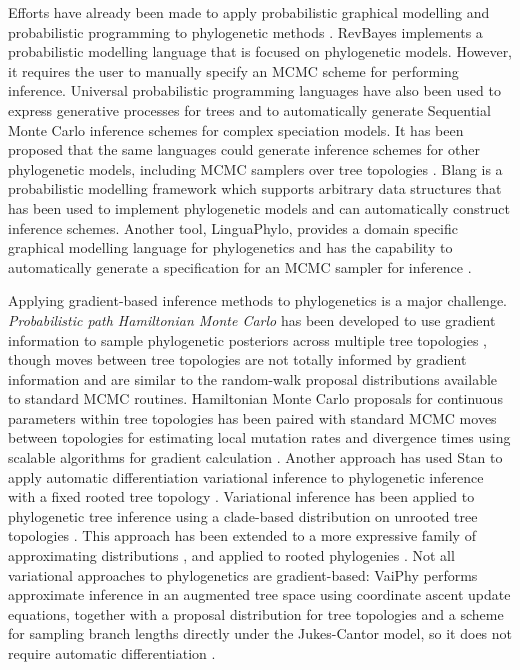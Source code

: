 Efforts have already been made to apply probabilistic graphical modelling and probabilistic programming to phylogenetic methods
\cite{hohna2014probabilistic, fourment2019evaluating, ronquist2021universal, drummond2023linguaphylo}. RevBayes \cite{hohna2016revbayes} implements a probabilistic modelling language that is focused on phylogenetic models. However, it requires the user to manually specify an MCMC scheme for performing inference. Universal probabilistic programming languages have also been used to express generative processes for trees and to automatically generate Sequential Monte Carlo inference schemes for complex speciation models. It has been proposed that the same languages could generate inference schemes for other phylogenetic models, including MCMC samplers over tree topologies \cite{ronquist2021universal, senderov2024treeppl}. Blang \cite{bouchard2022blang} is a probabilistic modelling framework which supports arbitrary data structures that has been used to implement phylogenetic models and can automatically construct inference schemes. Another tool, LinguaPhylo, provides a domain specific graphical modelling language for phylogenetics and has the capability to automatically generate a specification for an MCMC sampler for inference \cite{drummond2023linguaphylo}.

Applying gradient-based inference methods to phylogenetics is a major challenge. \textit{Probabilistic path Hamiltonian Monte Carlo} has been developed to use gradient information to sample phylogenetic posteriors across multiple tree topologies \cite{dinh2017probabilistic}, though moves between tree topologies are not totally informed by gradient information and are similar to the random-walk proposal distributions available to standard MCMC routines. Hamiltonian Monte Carlo proposals for continuous parameters within tree topologies has been paired with standard MCMC moves between topologies for estimating local mutation rates and divergence times using scalable algorithms for gradient calculation \cite{fisher2023shrinkage, ji2023scalable}. Another approach has used Stan to apply automatic differentiation variational inference to phylogenetic inference with a fixed rooted tree topology \cite{fourment2019evaluating}. Variational inference has been applied to phylogenetic tree inference using a clade-based distribution on unrooted tree topologies \cite{zhang2018variational}. This approach has been extended to a more expressive family of approximating distributions \cite{zhang2020improved}, and applied to rooted phylogenies \cite{zhang2022variational}. Not all variational approaches to phylogenetics are gradient-based: VaiPhy performs approximate inference in an augmented tree space using coordinate ascent update equations, together with a proposal distribution for tree topologies and a scheme for sampling branch lengths directly under the Jukes-Cantor model, so it does not require automatic differentiation \cite{koptagel2022vaiphy}.

